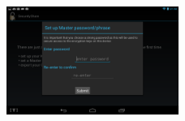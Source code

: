 \begin{figure}[h!]
    \centering
    \includegraphics[width=0.5\textwidth]{Setup}                                                                                                                                                                                                                                                                                                                                                                                                                                                                                                                                                                                                                                                                                                                                                                                                                                                                                                                                                                                                                                                                                                                                                                                                                                                                                                                                                                                                                                                                                                                                                                                                                                                                                                                                                                                                                                                                                                                                                                                                                                                                                                                                                                                                                                                                                                                                                                                                                                                                                                                                                                                                                                                                                                                                                                                                                                                                     
\end{figure}
